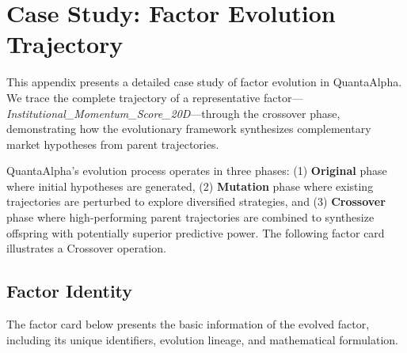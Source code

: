 %
%
%

\section{Case Study: Factor Evolution Trajectory}
\label{sec:appendix_case_study}

This appendix presents a detailed case study of factor evolution in QuantaAlpha. We trace the complete trajectory of a representative factor---\textit{Institutional\_Momentum\_Score\_20D}---through the crossover phase, demonstrating how the evolutionary framework synthesizes complementary market hypotheses from parent trajectories.

QuantaAlpha's evolution process operates in three phases: (1) \textbf{Original} phase where initial hypotheses are generated, (2) \textbf{Mutation} phase where existing trajectories are perturbed to explore diversified strategies, and (3) \textbf{Crossover} phase where high-performing parent trajectories are combined to synthesize offspring with potentially superior predictive power. The following factor card illustrates a Crossover operation.

\subsection{Factor Identity}

The factor card below presents the basic information of the evolved factor, including its unique identifiers, evolution lineage, and mathematical formulation.

